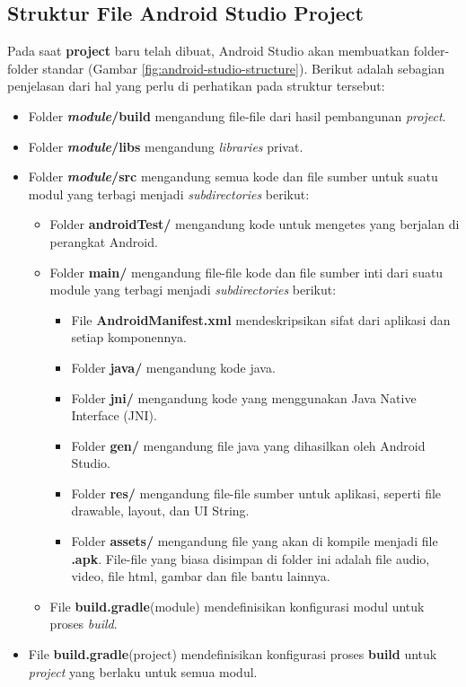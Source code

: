 \subsection{Struktur File Android Studio Project}\cite{android_developers}
Pada saat \textbf{project} baru telah dibuat, Android Studio akan membuatkan folder-folder standar (Gambar \ref{fig:android-studio-structure}). Berikut adalah sebagian penjelasan dari hal yang perlu di perhatikan pada struktur tersebut:
\begin{itemize}
	\item Folder \textbf{\textit{module}/build} mengandung file-file dari hasil pembangunan \textit{project}.
	\item Folder \textbf{\textit{module}/libs} mengandung \textit{libraries} privat.
	\item Folder \textbf{\textit{module}/src} mengandung semua kode dan file sumber untuk suatu modul yang terbagi menjadi \textit{subdirectories} berikut:
	\begin{itemize}
		\item Folder \textbf{androidTest/} mengandung kode untuk mengetes yang berjalan di perangkat Android. 
		\item Folder \textbf{main/} mengandung file-file kode dan file sumber inti dari suatu module yang terbagi menjadi \textit{subdirectories} berikut:
		\begin{itemize}
			\item File \textbf{AndroidManifest.xml} mendeskripsikan sifat dari aplikasi dan setiap komponennya. 
			\item Folder \textbf{java/} mengandung kode java.
			\item Folder \textbf{jni/} mengandung kode yang menggunakan Java Native Interface (JNI).
			\item Folder \textbf{gen/} mengandung file java yang dihasilkan oleh Android Studio.
			\item Folder \textbf{res/} mengandung file-file sumber untuk aplikasi, seperti file drawable, layout, dan UI String.
			\item Folder \textbf{assets/} mengandung file yang akan di kompile menjadi file \textbf{.apk}. File-file yang biasa disimpan di folder ini adalah file audio, video, file html, gambar dan file bantu lainnya.
		\end{itemize}
		\item File \textbf{build.gradle}(module) mendefinisikan konfigurasi modul untuk proses \textit{build}.
	\end{itemize}
	\item File \textbf{build.gradle}(project) mendefinisikan konfigurasi proses \textbf{build} untuk \textit{project} yang berlaku untuk semua modul.
\end{itemize}
